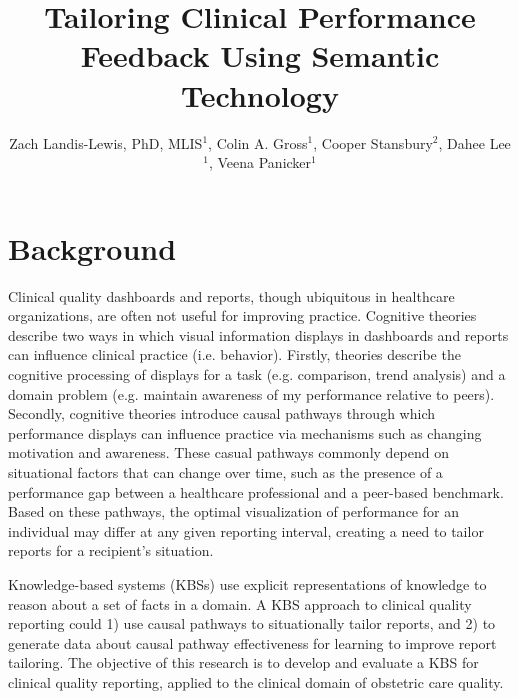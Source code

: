 \documentclass{amia}
\begin{document}
\title{Tailoring Clinical Performance Feedback Using Semantic Technology}
\author{Zach Landis-Lewis, PhD, MLIS$^{1}$, Colin A. Gross$^{1}$, Cooper Stansbury$^{2}$, Dahee Lee$^{1}$, Veena Panicker$^{1}$}

\maketitle

\section*{Background}

Clinical quality dashboards and reports, though ubiquitous in healthcare organizations, are often not useful for improving practice\cite{ivers2012, tuti2017}. Cognitive theories describe two ways in which visual information displays in dashboards and reports can influence clinical practice (i.e. behavior). Firstly, theories describe the cognitive processing of displays for a task (e.g. comparison, trend analysis) and a domain problem (e.g. maintain awareness of my performance relative to peers)\cite{zhang1996, munzner2014}. Secondly, cognitive theories introduce causal pathways through which performance displays can influence practice via mechanisms such as changing motivation and awareness\cite{kluger1996}. These casual pathways commonly depend on situational factors that can change over time, such as the presence of a performance gap between a healthcare professional and a peer-based benchmark. Based on these pathways, the optimal visualization of performance for an individual may differ at any given reporting interval, creating a need to tailor reports for a recipient's situation. 

Knowledge-based systems (KBSs) use explicit representations of knowledge to reason about a set of facts in a domain\cite{neapolitan2018}. A KBS approach to clinical quality reporting could 1) use causal pathways to situationally tailor reports, and 2) to generate data about causal pathway effectiveness for learning to improve report tailoring. The objective of this research is to develop and evaluate a KBS for clinical quality reporting, applied to the clinical domain of obstetric care quality.

\end{document}
